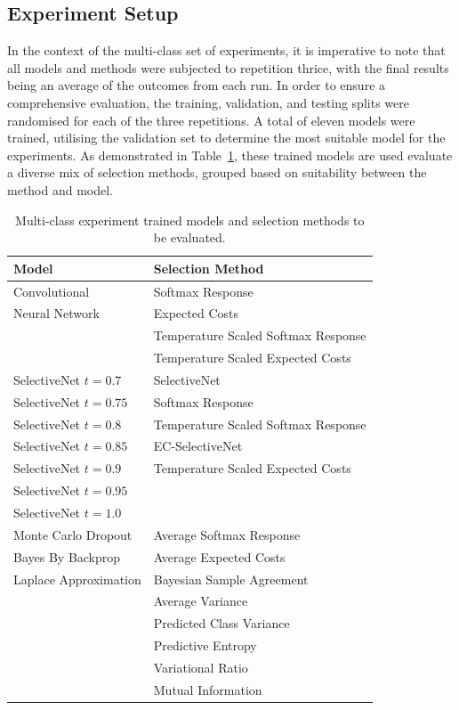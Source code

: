 \subsection{Experiment Setup}
In the context of the multi-class set of experiments, it is imperative to note that all models and methods were subjected to repetition thrice, with the final results being an average of the outcomes from each run. In order to ensure a comprehensive evaluation, the training, validation, and testing splits were randomised for each of the three repetitions. A total of eleven models were trained, utilising the validation set to determine the most suitable model for the experiments. As demonstrated in Table~\ref{tab:multi-class-experiment-setup}, these trained models are used evaluate a diverse mix of selection methods, grouped based on suitability between the method and model.

\begin{table}[h]
	\centering
	\caption{Multi-class experiment trained models and selection methods to be evaluated.}
	\label{tab:multi-class-experiment-setup}
	\begin{tabular}{|l|l|}
		\hline
		Model & Selection Method \\ \hline
		Convolutional & Softmax Response \\
		Neural Network & Expected Costs \\
		& Temperature Scaled Softmax Response \\
		& Temperature Scaled Expected Costs \\ \hline
		SelectiveNet $t=0.7$ & SelectiveNet \\
		SelectiveNet $t=0.75$ & Softmax Response \\
		SelectiveNet $t=0.8$ & Temperature Scaled Softmax Response \\
		SelectiveNet $t=0.85$ & EC-SelectiveNet \\
		SelectiveNet $t=0.9$ & Temperature Scaled Expected Costs \\
		SelectiveNet $t=0.95$ &  \\
		SelectiveNet $t=1.0$ &  \\ \hline
		Monte Carlo Dropout & Average Softmax Response \\
		Bayes By Backprop & Average Expected Costs \\
		Laplace Approximation & Bayesian Sample Agreement \\
		& Average Variance \\
		& Predicted Class Variance \\
		& Predictive Entropy \\
		& Variational Ratio \\
		& Mutual Information \\ \hline
	\end{tabular}
\end{table}

